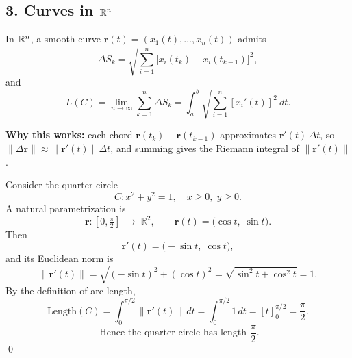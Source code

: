\documentclass[11pt,openany]{article}
\begin{document}
\bigskip

\subsection*{3. Curves in \(\mathbb{R}^n\)}

In \(\mathbb{R}^n\), a smooth curve \(\mathbf r(t)=(x_1(t),\dots,x_n(t))\) admits
\[
\Delta S_k
=\sqrt{\sum_{i=1}^n\bigl[x_i(t_k)-x_i(t_{k-1})\bigr]^2},
\]
and
\[
L(C)
=\lim_{n\to\infty}\sum_{k=1}^n\Delta S_k
=\int_a^b\sqrt{\sum_{i=1}^n [x_i'(t)]^2}\,dt.
\]

\bigskip

\noindent\textbf{Why this works:} each chord  
\(\mathbf r(t_k)-\mathbf r(t_{k-1})\)  
approximates \(\mathbf r'(t)\,\Delta t\), so
\(\|\Delta\mathbf r\|\approx\|\mathbf r'(t)\|\Delta t\),  
and summing gives the Riemann integral of \(\|\mathbf r'(t)\|\).


Consider the quarter‐circle \[
C\colon x^2 + y^2 = 1,\quad x\ge0,\;y\ge0.
\]
A natural parametrization is
\[
\mathbf r\colon 
[0,\tfrac\pi2]\;\longrightarrow\;\mathbb{R}^2,
\qquad
\mathbf r(t) = \bigl(\cos t,\;\sin t\bigr).
\]
Then
\[
\mathbf r'(t)
= \bigl(-\sin t,\;\cos t\bigr),
\]
and its Euclidean norm is
\[
\bigl\|\mathbf r'(t)\bigr\|
= \sqrt{(-\sin t)^2 + (\cos t)^2}
=\sqrt{\sin^2t + \cos^2t}
=1.
\]
By the definition of arc length,
\[
\text{Length}(C)
= \int_{0}^{\pi/2} \bigl\|\mathbf r'(t)\bigr\|\,dt
= \int_{0}^{\pi/2}1\,dt
= \left[t\right]_{0}^{\pi/2}
= \frac\pi2.
\]
\[
\boxed{\;\text{Hence the quarter‐circle has length } \frac\pi2.\!}
\]
\qed
\end{document}

